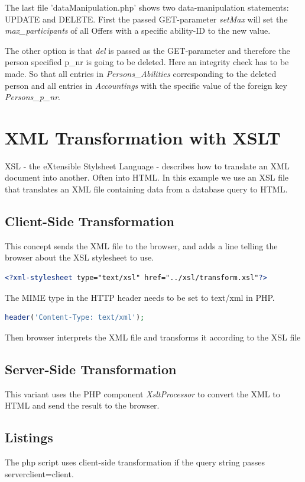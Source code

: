 \documentclass[12pt,a4paper,english]{article}
\begin{document}



The last file 'dataManipulation.php' shows two data-manipulation statements: UPDATE and DELETE. First the passed GET-parameter 
\textit{setMax} will set the \textit{max\_participants} of all Offers with a specific ability-ID to the new value. 

The other option is that \textit{del} is passed as the GET-parameter and therefore the person specified p\_nr is going to 
be deleted. Here an integrity check has to be made. So that all entries in \textit{Persons\_Abilities} corresponding to the
deleted person and all entries in \textit{Accountings} with the specific value of the foreign key \textit{Persons\_p\_nr}.


 
\section{XML Transformation with XSLT} \label{sec:xsl}
XSL - the eXtensible Stylsheet Language - describes how to translate an XML document into another.
Often into HTML. In this example we use an XSL file that translates an XML file containing data
from a database query to HTML.

\subsection{Client-Side Transformation}
This concept sends the XML file to the browser, and adds a line telling the browser about
the XSL stylesheet to use.
\begin{lstlisting}[language=XML]
<?xml-stylesheet type="text/xsl" href="../xsl/transform.xsl"?>
\end{lstlisting}
The MIME type in the HTTP header needs to be set to text/xml in PHP. 
\begin{lstlisting}[language=PHP]
header('Content-Type: text/xml');
\end{lstlisting}

Then browser
interprets the XML file and transforms it according to the XSL file

\subsection{Server-Side Transformation}
This variant uses the PHP component \emph{XsltProcessor} to convert the XML to HTML
and send the result to the browser.

\subsection{Listings}
The php script uses client-side transformation if the query string passes serverclient=client.


\end{document}
